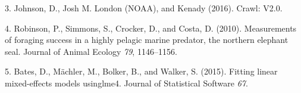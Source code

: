 \documentclass[
]{article}
\begin{document}
\leavevmode\hypertarget{ref-johnson2016}{}%
3. Johnson, D., Josh M. London (NOAA), and Kenady (2016). Crawl: V2.0.

\leavevmode\hypertarget{ref-robinson2010}{}%
4. Robinson, P., Simmons, S., Crocker, D., and Costa, D. (2010).
Measurements of foraging success in a highly pelagic marine predator,
the northern elephant seal. Journal of Animal Ecology \emph{79},
1146--1156.

\leavevmode\hypertarget{ref-bates2015}{}%
5. Bates, D., Mächler, M., Bolker, B., and Walker, S. (2015). Fitting
linear mixed-effects models usinglme4. Journal of Statistical Software
\emph{67}.
\end{document}
